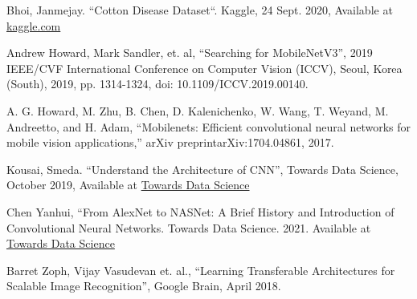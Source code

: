 \documentclass[conference]{IEEEtran}
\begin{document}
\begin{thebibliography}{00}
 Bhoi, Janmejay. ``Cotton Disease Dataset``. Kaggle, 24 Sept. 2020, Available at \href{https://www.kaggle.com/janmejaybhoi/cotton-disease-dataset/notebooks}{kaggle.com}

 Andrew Howard, Mark Sandler, et. al, ``Searching for MobileNetV3'', 2019 IEEE/CVF International Conference on Computer Vision (ICCV), Seoul, Korea (South), 2019, pp. 1314-1324, doi: 10.1109/ICCV.2019.00140.



 A. G. Howard, M. Zhu, B. Chen, D. Kalenichenko, W. Wang, T. Weyand, M. Andreetto, and H. Adam, “Mobilenets: Efficient convolutional neural networks for mobile vision applications,” arXiv preprintarXiv:1704.04861, 2017.

 Kousai, Smeda. ``Understand the Architecture of CNN'', Towards Data Science, October 2019, Available at \href{https://towardsdatascience.com/understand-the-architecture-of-cnn-90a25e244c7}{Towards Data Science}

 Chen Yanhui, ``From AlexNet to NASNet: A Brief History and Introduction of Convolutional Neural Networks. Towards Data Science. 2021. Available at \href{https://towardsdatascience.com/from-alexnet-to-NASNet-a-brief-history-and-introduction-of-convolutional-neural-networks-cf63bf3320e1}{Towards Data Science}

 Barret Zoph, Vijay Vasudevan et. al., ``Learning Transferable Architectures for Scalable Image Recognition'', Google Brain, April 2018.






\end{thebibliography}
\end{document}
